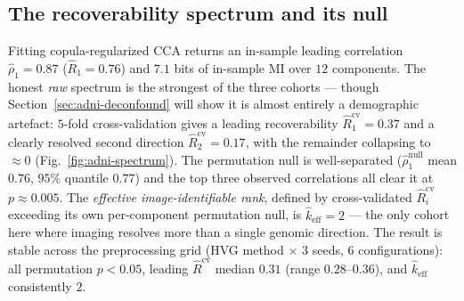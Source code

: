 \documentclass{article}
\begin{document}
\subsection{The recoverability spectrum and its null}
\label{sec:adni-spectrum}
Fitting copula-regularized CCA returns an in-sample leading correlation
$\hat\rho_1 = 0.87$ ($\hat R_1 = 0.76$) and $7.1$ bits of in-sample MI over $12$
components. The honest \emph{raw} spectrum is the strongest of the three
cohorts --- though Section~\ref{sec:adni-deconfound} will show it is almost
entirely a demographic artefact:
$5$-fold cross-validation gives a leading recoverability
$\hat R_1^{\mathrm{cv}} = 0.37$ and a clearly resolved second direction
$\hat R_2^{\mathrm{cv}} = 0.17$, with the remainder collapsing to $\approx 0$
(Fig.~\ref{fig:adni-spectrum}). The permutation null is well-separated
($\hat\rho_1^{\mathrm{null}}$ mean $0.76$, $95\%$ quantile $0.77$) and the top
three observed correlations all clear it at $p \approx 0.005$. The
\emph{effective image-identifiable rank}, defined by cross-validated $\hat
R_i^{\mathrm{cv}}$ exceeding its own per-component permutation null, is
$\hat k_{\mathrm{eff}} = 2$ --- the only cohort here where imaging resolves more
than a single genomic direction. The result is stable across the preprocessing
grid (HVG method $\times$ $3$ seeds, $6$ configurations): all permutation
$p < 0.05$, leading $\hat R^{\mathrm{cv}}$ median $0.31$ (range $0.28$--$0.36$),
and $\hat k_{\mathrm{eff}}$ consistently $2$.
\end{document}
